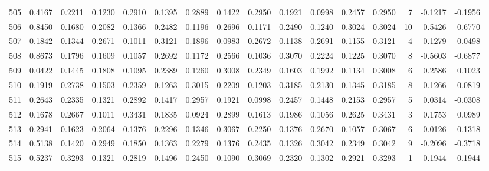 \begin{tabular}{lrrrrrrrrrrrrrrr}
505 &      0.4167 &  0.2211 &  0.1230 &  0.2910 &  0.1395 &  0.2889 &  0.1422 &  0.2950 &  0.1921 &  0.0998 &   0.2457 &     0.2950 &      7 &                   -0.1217 &                    -0.1956 \\
506 &      0.8450 &  0.1680 &  0.2082 &  0.1366 &  0.2482 &  0.1196 &  0.2696 &  0.1171 &  0.2490 &  0.1240 &   0.3024 &     0.3024 &     10 &                   -0.5426 &                    -0.6770 \\
507 &      0.1842 &  0.1344 &  0.2671 &  0.1011 &  0.3121 &  0.1896 &  0.0983 &  0.2672 &  0.1138 &  0.2691 &   0.1155 &     0.3121 &      4 &                    0.1279 &                    -0.0498 \\
508 &      0.8673 &  0.1796 &  0.1609 &  0.1057 &  0.2692 &  0.1172 &  0.2566 &  0.1036 &  0.3070 &  0.2224 &   0.1225 &     0.3070 &      8 &                   -0.5603 &                    -0.6877 \\
509 &      0.0422 &  0.1445 &  0.1808 &  0.1095 &  0.2389 &  0.1260 &  0.3008 &  0.2349 &  0.1603 &  0.1992 &   0.1134 &     0.3008 &      6 &                    0.2586 &                     0.1023 \\
510 &      0.1919 &  0.2738 &  0.1503 &  0.2359 &  0.1263 &  0.3015 &  0.2209 &  0.1203 &  0.3185 &  0.2130 &   0.1345 &     0.3185 &      8 &                    0.1266 &                     0.0819 \\
511 &      0.2643 &  0.2335 &  0.1321 &  0.2892 &  0.1417 &  0.2957 &  0.1921 &  0.0998 &  0.2457 &  0.1448 &   0.2153 &     0.2957 &      5 &                    0.0314 &                    -0.0308 \\
512 &      0.1678 &  0.2667 &  0.1011 &  0.3431 &  0.1835 &  0.0924 &  0.2899 &  0.1613 &  0.1986 &  0.1056 &   0.2625 &     0.3431 &      3 &                    0.1753 &                     0.0989 \\
513 &      0.2941 &  0.1623 &  0.2064 &  0.1376 &  0.2296 &  0.1346 &  0.3067 &  0.2250 &  0.1376 &  0.2670 &   0.1057 &     0.3067 &      6 &                    0.0126 &                    -0.1318 \\
514 &      0.5138 &  0.1420 &  0.2949 &  0.1850 &  0.1363 &  0.2279 &  0.1376 &  0.2435 &  0.1326 &  0.3042 &   0.2349 &     0.3042 &      9 &                   -0.2096 &                    -0.3718 \\
515 &      0.5237 &  0.3293 &  0.1321 &  0.2819 &  0.1496 &  0.2450 &  0.1090 &  0.3069 &  0.2320 &  0.1302 &   0.2921 &     0.3293 &      1 &                   -0.1944 &                    -0.1944 \\

\end{tabular}
